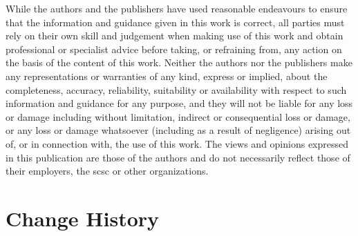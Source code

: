 While the authors and the publishers have used reasonable endeavours to ensure that the information and guidance given in this work is correct, all parties must rely on their own skill and judgement when making use of this work and obtain professional or specialist advice before taking, or refraining from, any action on the basis of the content of this work. Neither the authors nor the publishers make any representations or warranties of any kind, express or implied, about the completeness, accuracy, reliability, suitability or availability with respect to such information and guidance for any purpose, and they will not be liable for any loss or damage including without limitation, indirect or consequential loss or damage, or any loss or damage whatsoever (including as a result of negligence) arising out of, or in connection with, the use of this work. The views and opinions expressed in this publication are those of the authors and do not necessarily reflect those of their employers, the \gls{scsc} or other organizations.

\thispagestyle{empty}%
\clearpage
\cbstart %
\maketitle
\cbend %
\thispagestyle{empty}%

\clearpage
\section*{Change History}
\thispagestyle{empty}%

